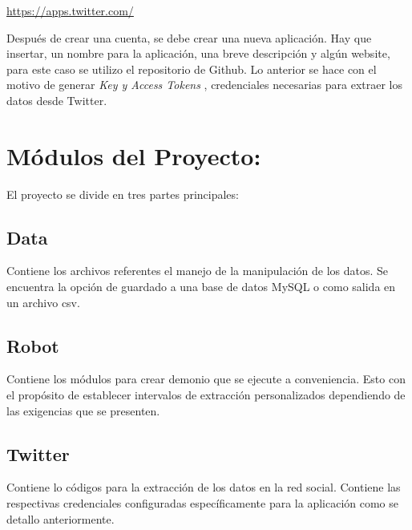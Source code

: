 \documentclass[12pt,letterpaper]{article}
\begin{document}
\begin{center}
\url {https://apps.twitter.com/} 
\end{center}

Después de crear una cuenta, se debe crear una nueva aplicación. Hay que insertar, un nombre para la aplicación, una breve descripción y algún website, para este caso se utilizo el repositorio de Github. Lo anterior se hace con el motivo de generar \textit{Key y Access Tokens }, credenciales necesarias para extraer los datos desde Twitter.

\section{Módulos del Proyecto:}

El proyecto se divide en tres partes principales:

\subsection{Data}

Contiene los archivos referentes el manejo de la manipulación de los datos. Se encuentra la opción de guardado a una base de datos MySQL o como salida en un  archivo csv.
\subsection{ Robot}

 Contiene los módulos para crear demonio que se ejecute a conveniencia. Esto con el propósito de establecer intervalos de extracción personalizados dependiendo de las exigencias que se presenten.

\subsection{Twitter} 

Contiene lo códigos para la extracción de los datos en la red social. Contiene las respectivas credenciales configuradas específicamente para la aplicación como se detallo anteriormente.


\appendix
\end{document}

